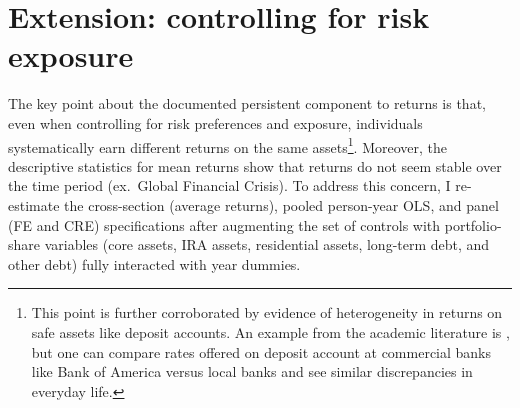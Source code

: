 \onlyinsubfile{\setcounter{section}{4}}
\section{Extension: controlling for risk exposure}
\label{sec:exts}

\providecommand{\ChapterTableNoteText}[1]{\parbox[t]{0.94\textwidth}{#1}}
\providecommand{\InputStataRegTable}[4]{%
\begin{table}[htbp]
\centering
\caption{#1}%
\label{#2}%
\begin{threeparttable}
\small
\resizebox{\textwidth}{!}{%
%
}%
\begin{tablenotes}[flushleft]
\footnotesize
\item \ChapterTableNoteText{#4}%
\end{tablenotes}
\end{threeparttable}
\end{table}%
}
\providecommand{\InputStataRegTableCompact}[4]{%
\begin{table}[htbp]
\centering
\caption{#1}%
\label{#2}%
\begin{threeparttable}
\begingroup
\footnotesize
\setlength{\tabcolsep}{4pt}%
\renewcommand{\arraystretch}{0.94}%
\resizebox{\textwidth}{!}{%
%
}%
\endgroup
\begin{tablenotes}[flushleft]
\footnotesize
\item \ChapterTableNoteText{#4}%
\end{tablenotes}
\end{threeparttable}
\end{table}%
}



\par The key point about the documented persistent component to returns is that, even when controlling for risk preferences and exposure, individuals systematically earn different returns on the same assets\footnote{This point is further corroborated by evidence of heterogeneity in returns on safe assets like deposit accounts. An example from the academic literature is \cite{Deuflhard14}, but one can compare rates offered on deposit account at commercial banks like Bank of America versus local banks and see similar discrepancies in everyday life.}. Moreover, the descriptive statistics for mean returns show that returns do not seem stable over the time period (ex.\ Global Financial Crisis). To address this concern, I re-estimate the cross-section (average returns), pooled person-year OLS, and panel (FE and CRE) specifications after augmenting the set of controls with portfolio-share variables (core assets, IRA assets, residential assets, long-term debt, and other debt) fully interacted with year dummies. 

